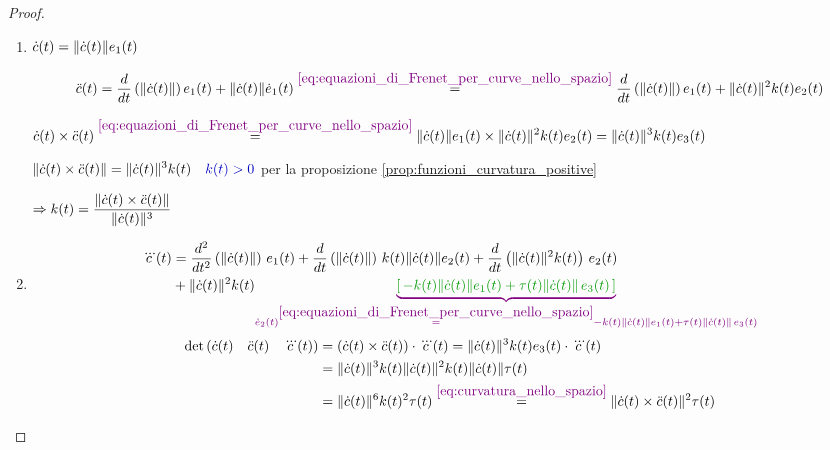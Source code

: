         \begin{proof}
        \mbox{}

        \begin{enumerate}
            \item $\dot{c}(t) = \lVert\dot{c}(t)\rVert e_1(t) $
            
            \begin{equation}
            \label{eq:c2punti_nello_spazio} 
            \ddot{c}(t) = \frac{d}{dt} \left( \lVert\dot{c}(t)\rVert \right) e_1(t) + \lVert\dot{c}(t)\rVert \dot{e}_1(t) \overset{\textcolor{violet}{\eqref{eq:equazioni_di_Frenet_per_curve_nello_spazio}}}{=} \frac{d}{dt} \left( \lVert\dot{c}(t)\rVert \right) e_1(t) + \lVert\dot{c}(t)\rVert^2 k(t) e_2(t)
            \end{equation}

            $\displaystyle \dot{c}(t) \times \ddot{c}(t) \overset{\textcolor{violet}{\eqref{eq:equazioni_di_Frenet_per_curve_nello_spazio}}}{=}  \lVert\dot{c}(t)\rVert e_1(t) \times \lVert\dot{c}(t)\rVert^2 k(t) e_2(t) = \lVert\dot{c}(t)\rVert^3 k(t) e_3(t) $

            $\displaystyle  \norm{\dot{c}(t) \times \ddot{c}(t)} = \norm{\dot{c}(t)}^3 k(t) \quad \textcolor{blu}{k(t)>0}$ \textcolor{blu}{per la proposizione \ref{prop:funzioni_curvatura_positive}}

            $\displaystyle \Rightarrow k(t) = \frac{\lVert\dot{c}(t) \times \ddot{c}(t)\rVert}{\lVert\dot{c}(t)\rVert^3}$
            \item 
            \begin{align*}
            \dddot{c}(t) &= \frac{d^2}{dt^2} \left( \norm{\dot{c}(t)} \right) \, e_1(t) +  \frac{d}{dt} \left( \norm{\dot{c}(t)} \right) \, k(t) \norm{\dot{c}(t)} e_2(t) +
            \frac{d}{dt} \left( \norm{\dot{c}(t)}^2 k(t) \right) \, e_2(t) \\ 
            &+ \norm{\dot{c}(t)}^2 k(t) \textcolor{violet}{\underbrace{\textcolor{verde}{\left[ \, - k(t) \norm{\dot{c}(t)} e_1(t) + \tau(t) \norm{\dot{c}(t)} \, e_3(t) \,  \right]}}_{\dot{e}_2(t) \overset{\eqref{eq:equazioni_di_Frenet_per_curve_nello_spazio}}{=} - k(t) \norm{\dot{c}(t)} e_1(t) + \tau(t) \norm{\dot{c}(t)} \, e_3(t) }} 
            \end{align*}
            \begin{align*}
            \det{ \left( \dot{c}(t) \quad \ddot{c}(t) \quad \dddot{c}(t) \right) } &= \left( \dot{c}(t) \times \ddot{c}(t) \right) \cdot \dddot{c}(t) = \lVert\dot{c}(t)\rVert^3 k(t) e_3 (t) \cdot \dddot{c}(t) \\
            &= \lVert\dot{c}(t)\rVert^3 k(t) \lVert\dot{c}(t)\rVert^2 k(t) \lVert\dot{c}(t)\rVert \tau(t) \\
            &= \lVert\dot{c}(t)\rVert^6 k(t)^2 \tau(t) \overset{\textcolor{violet}{\eqref{eq:curvatura_nello_spazio}}}{=} \lVert \dot{c}(t) \times \ddot{c}(t) \rVert^2 \tau(t)
            \end{align*}
        \end{enumerate}
        \end{proof}

